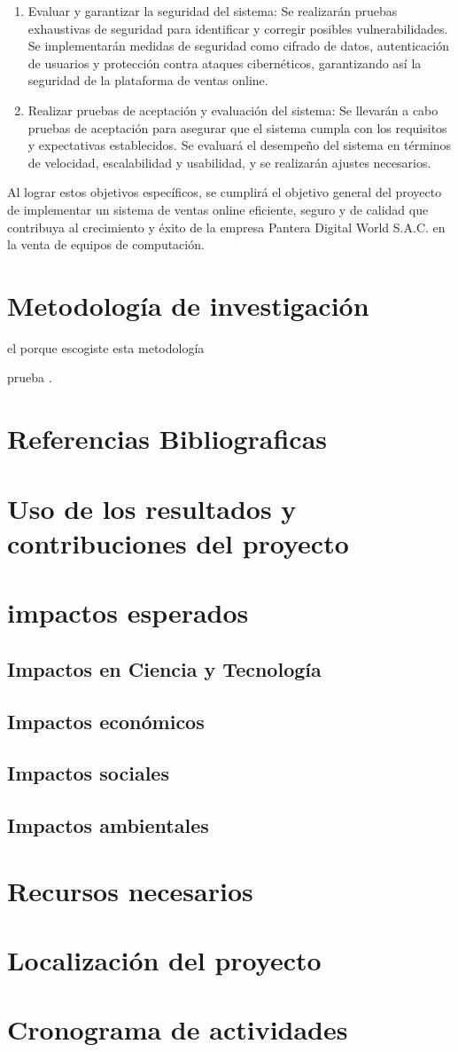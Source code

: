 \documentclass[12pt,a4paper]{article}
\newcommand{\newsection}[1]{\section{\hspace{6mm} #1}}%
\newcommand{\newsubsection}[1]{\subsection{\hspace{5mm} #1}}
\newcommand{\empresa}{Pantera Digital World S.A.C. }
\begin{document}
\begin{enumerate}
\item Evaluar y garantizar la seguridad del sistema: Se realizarán pruebas exhaustivas de seguridad para identificar y corregir posibles vulnerabilidades. Se implementarán medidas de seguridad como cifrado de datos, autenticación de usuarios y protección contra ataques cibernéticos, garantizando así la seguridad de la plataforma de ventas online.
\item Realizar pruebas de aceptación y evaluación del sistema: Se llevarán a cabo pruebas de aceptación para asegurar que el sistema cumpla con los requisitos y expectativas establecidos. Se evaluará el desempeño del sistema en términos de velocidad, escalabilidad y usabilidad, y se realizarán ajustes necesarios.
\end{enumerate}
Al lograr estos objetivos específicos, se cumplirá el objetivo general del proyecto de implementar un sistema de ventas online eficiente, seguro y de calidad que contribuya al crecimiento y éxito de la empresa \empresa en la venta de equipos de computación. %
\newpage
\newsection{Metodología de investigación }
el porque escogiste esta metodología

prueba \cite{prueba}.

\newpage
%
\newsection{Referencias Bibliograficas}



\newpage
\newsection{Uso de los resultados y contribuciones del proyecto}
\lipsum[1] %

\newpage
\newsection{impactos esperados}
\lipsum[1] %
    \newsubsection{Impactos en Ciencia y Tecnología}
    \lipsum[1] %

    \newsubsection{Impactos económicos}
    \lipsum[1] %

    \newsubsection{Impactos sociales}
    \lipsum[1] %

    \newsubsection{Impactos ambientales}
    \lipsum[1] %

\newpage
\newsection{Recursos necesarios }
\lipsum[1] %

\newpage
\newsection{Localización del proyecto }
\lipsum[1] %



\newpage
\newsection{Cronograma de actividades}
\lipsum[1]
\end{document}
